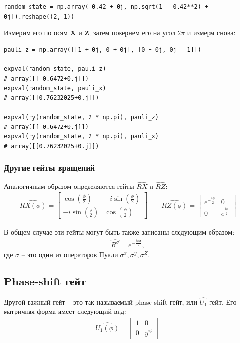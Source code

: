 \documentclass[11pt]{article}
\begin{document}
\begin{verbatim}
random_state = np.array([0.42 + 0j, np.sqrt(1 - 0.42**2) + 0j]).reshape((2, 1))
\end{verbatim}

Измерим его по осям \(\mathbf{X}\) и \(\mathbf{Z}\), затем повернем его на угол \(2\pi\) и измерм снова:

\begin{verbatim}
pauli_z = np.array([[1 + 0j, 0 + 0j], [0 + 0j, 0j - 1]])

expval(random_state, pauli_z)
# array([[-0.6472+0.j]])
expval(random_state, pauli_x)
# array([[0.76232025+0.j]])

expval(ry(random_state, 2 * np.pi), pauli_z)
# array([[-0.6472+0.j]])
expval(ry(random_state, 2 * np.pi), pauli_x)
# array([[0.76232025+0.j]])
\end{verbatim}

\subsubsection{Другие гейты вращений}
\label{sec:org9ff96bc}
Аналогичным образом определяются гейты \(\hat{RX}\) и \(\hat{RZ}\):
\begin{align*}
\hat{RX(\phi)} = \begin{bmatrix}
\cos(\frac{\phi}{2}) & -i\sin(\frac{\phi}{2}) \\
-i\sin(\frac{\phi}{2}) & \cos(\frac{\phi}{2})
\end{bmatrix} \qquad \hat{RZ(\phi)} = \begin{bmatrix}
e^{-\frac{i\phi}{2}} & 0 \\
0 & e^{\frac{i\phi}{2}}
\end{bmatrix}
\end{align*}

В общем случае эти гейты могут быть также записаны следующим образом:
\begin{align*}
\hat{R^\sigma} = e^{-\frac{i\phi\sigma}{2}},
\end{align*}
где \(\sigma\) -- это один из операторов Пуали \(\sigma^x, \sigma^y, \sigma^Z\).

\subsection{Phase-shift гейт}
\label{sec:org487ca7a}
Другой важный гейт -- это так называемый phase-shift гейт, или \(\hat{U_1}\) гейт. Его матричная форма имеет следующий вид:
\begin{align*}
\hat{U_1(\phi)} = \begin{bmatrix}
1 & 0 \\
0 & y^{i\phi}
\end{bmatrix}
\end{align*}
\end{document}
